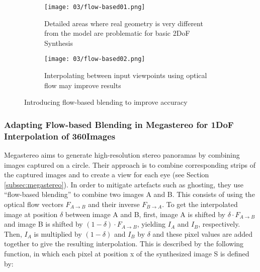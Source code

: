 \begin{figure}
\centering
    \hfill
    \begin{subfigure}[t]{0.4\textwidth}            
            \centering
            \texttt{[image: 03/flow-based01.png]}
            \caption{Detailed areas where real geometry is very different from the model are problematic for basic 2DoF Synthesis}
    \end{subfigure}%
    \hfill
    \begin{subfigure}[t]{0.4\textwidth}
            \centering
            \texttt{[image: 03/flow-based02.png]}
            \caption{Interpolating between input viewpoints using optical flow may improve results}
    \end{subfigure}
    \hfill
    \hfill
  \caption[Flow-based blending to improve accuracy in close, detailed areas]{Introducing flow-based blending to improve accuracy} \label{fig:flow-based-mot}
\end{figure}


\subsubsection{Adapting Flow-based Blending in Megastereo for 1DoF Interpolation of 360\degree Images}
Megastereo \cite{megastereo} aims to generate high-resolution stereo panoramas by combining images captured on a circle. Their approach is to combine corresponding strips of the captured images and to create a view for each eye (see Section \ref{subsec:megastereo}). In order to mitigate artefacts such as ghosting, they use ``flow-based blending'' to combine two images A and B. This consists of using the optical flow vectors $F_{A\rightarrow B}$ and their inverse $F_{B\rightarrow A}$. To get the interpolated image at position $\delta$ between image A and B, first, image A is shifted by $\delta \cdot F_{A\to B}$ and image B is shifted by $(1 - \delta) \cdot F_{A\to B}$, yielding $I_A$ and $I_B$, respectively. Then, $I_A$ is multiplied by $(1-\delta)$ and $I_B$ by $\delta$ and these pixel values are added together to give the resulting interpolation. This is described by the following function, in which each pixel at position x of the synthesized image S is defined by: 

